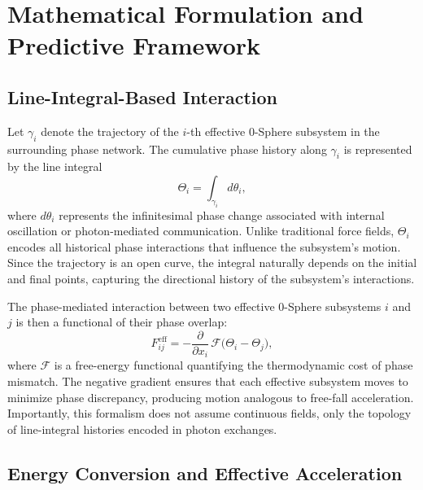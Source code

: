 \documentclass[%
 reprint,
 amsmath,amssymb,
 aps,
 prb,
]{revtex4-2}
\numberwithin{equation}{section}
\begin{document}
\section{Mathematical Formulation and Predictive Framework}
\label{sec:math}

\subsection{Line-Integral-Based Interaction}

Let $\gamma_i$ denote the trajectory of the $i$-th effective 0-Sphere subsystem in the surrounding phase network. The cumulative phase history along $\gamma_i$ is represented by the line integral \cite{Hanamura2026Trilogy3,AharonovBohm1959,Berry1984}
\begin{equation}
\Theta_i = \int_{\gamma_i} d\theta_i,
\label{eq:phase_history}
\end{equation}
where $d\theta_i$ represents the infinitesimal phase change associated with internal oscillation or photon-mediated communication. Unlike traditional force fields, $\Theta_i$ encodes all historical phase interactions that influence the subsystem's motion. Since the trajectory is an open curve, the integral naturally depends on the initial and final points, capturing the directional history of the subsystem's interactions.

The phase-mediated interaction between two effective 0-Sphere subsystems $i$ and $j$ is then a functional of their phase overlap:
\begin{equation}
F_{ij}^\text{eff} = - \frac{\partial}{\partial x_i} \, \mathcal{F}\Big( \Theta_i - \Theta_j \Big),
\label{eq:effective_force}
\end{equation}
where $\mathcal{F}$ is a free-energy functional \cite{Jaynes2003,Verlinde2011} quantifying the thermodynamic cost of phase mismatch. The negative gradient ensures that each effective subsystem moves to minimize phase discrepancy, producing motion analogous to free-fall acceleration. Importantly, this formalism does not assume continuous fields, only the topology of line-integral histories encoded in photon exchanges.

\subsection{Energy Conversion and Effective Acceleration}
\end{document}
